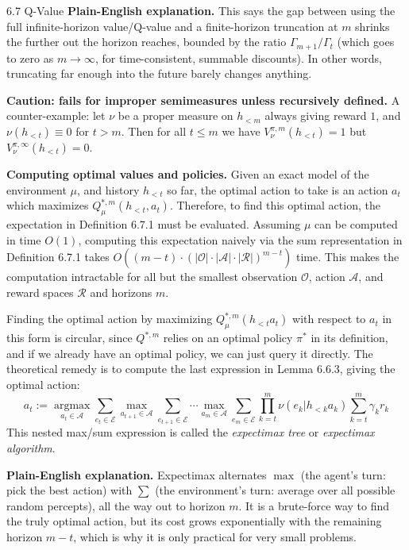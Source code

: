 \documentclass[aspectratio=169,10pt]{beamer}
\newcommand{\A}{\mathcal{A}}
\newcommand{\Ocal}{\mathcal{O}}
\newcommand{\Rcal}{\mathcal{R}}
\newcommand{\Ecal}{\mathcal{E}}
\begin{document}
\begin{frame}[allowframebreaks]{6.7 Q-Value}
\textbf{Plain-English explanation.} This says the gap between using the
full infinite-horizon value/Q-value and a finite-horizon truncation at $m$
shrinks the further out the horizon reaches, bounded by the ratio
$\Gamma_{m+1}/\Gamma_t$ (which goes to zero as $m\to\infty$, for
time-consistent, summable discounts). In other words, truncating far
enough into the future barely changes anything.

\vspace{0.15cm}
\textbf{Caution: fails for improper semimeasures unless recursively
defined.} A counter-example: let $\nu$ be a proper measure on $h_{<m}$
always giving reward $1$, and $\nu(h_{<t})\equiv 0$ for $t>m$. Then for all
$t \le m$ we have $V^{\pi,m}_\nu(h_{<t})=1$ but $V^{\pi,\infty}_\nu(h_{<t})=0$.

\framebreak

\textbf{Computing optimal values and policies.} Given an exact model of the
environment $\mu$, and history $h_{<t}$ so far, the optimal action to take
is an action $a_t$ which maximizes $Q^{*,m}_\mu(h_{<t},a_t)$. Therefore, to
find this optimal action, the expectation in Definition 6.7.1 must be
evaluated. Assuming $\mu$ can be computed in time $O(1)$, computing this
expectation naively via the sum representation in Definition 6.7.1 takes
$O((m-t)\cdot(|\Ocal|\cdot|\A|\cdot|\Rcal|)^{m-t})$ time. This makes the
computation intractable for all but the smallest observation $\Ocal$,
action $\A$, and reward spaces $\Rcal$ and horizons $m$.

\vspace{0.15cm}
Finding the optimal action by maximizing $Q^{*,m}_\mu(h_{<t}a_t)$ with
respect to $a_t$ in this form is circular, since $Q^{*,m}$ relies on an
optimal policy $\pi^{*}$ in its definition, and if we already have an
optimal policy, we can just query it directly. The theoretical remedy is to
compute the last expression in Lemma 6.6.3, giving the optimal action:
\[
  a_t := \operatorname*{argmax}_{a_t\in\A}\sum_{e_t\in\Ecal}\max_{a_{t+1}\in\A}\sum_{e_{t+1}\in\Ecal}
  \cdots\max_{a_m\in\A}\sum_{e_m\in\Ecal}\prod_{k=t}^m\nu(e_k|h_{<k}a_k)\sum_{k=t}^m\gamma_kr_k
  \tag{6.7.7}
\]
This nested max/sum expression is called the \emph{expectimax tree} or
\emph{expectimax algorithm}.

\framebreak

\textbf{Plain-English explanation.} Expectimax alternates $\max$ (the
agent's turn: pick the best action) with $\sum$ (the environment's turn:
average over all possible random percepts), all the way out to horizon
$m$. It is a brute-force way to find the truly optimal action, but its cost
grows exponentially with the remaining horizon $m-t$, which is why it is
only practical for very small problems.


\end{frame}
\end{document}
